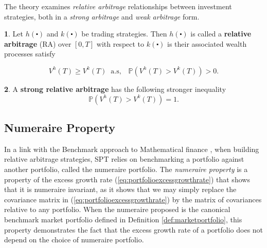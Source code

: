 \documentclass[british]{amsart} \usepackage{lmodern}
\numberwithin{equation}{section} \numberwithin{figure}{section}
\theoremstyle{plain} \newtheorem{thm}{\protect\theoremname}[section]
\theoremstyle{definition} \newtheorem{defn}[thm]{\protect\definitionname}
\theoremstyle{plain} \newtheorem{assumption}[thm]{\protect\assumptionname}
\theoremstyle{plain} \newtheorem{lem}[thm]{\protect\lemmaname}
\theoremstyle{plain} \newtheorem{prop}[thm]{\protect\propositionname}
\theoremstyle{remark} \newtheorem{rem}[thm]{\protect\remarkname}
\theoremstyle{plain} \newtheorem{cor}[thm]{\protect\corollaryname}
\begin{document}
The theory examines \textit{relative arbitrage} relationships between investment
strategies, both in a \textit{strong arbitrage} and \textit{weak arbitrage}
form.

\begin{defn}
  Let $h(\centerdot)$ and $k(\centerdot)$ be trading strategies. Then
  $h(\centerdot)$ is called a \textbf{relative arbitrage} (RA) over
  $[0,T]$ with respect to $k(\centerdot)$ is their associated wealth
  processes satisfy

  \begin{equation}
    V^{h}(T)\ge V^{k}(T)\;\;\text{a.s},\;\;\;\mathbb{P}(V^{h}(T)>V^{k}(T))>0.
  \end{equation}
\end{defn}

\begin{defn}
  A \textbf{strong relative arbitrage} has the following stronger inequality
  \begin{equation}
    \mathbb{P}(V^{h}(T)>V^{k}(T))=1.
  \end{equation}
\end{defn}

\subsection{Numeraire Property}

In a link with the Benchmark approach to Mathematical finance \cite{platen2006},
when building relative arbitrage strategies, SPT relies on benchmarking a
portfolio against another portfolio, called the numeraire portfolio. The
\textit{numeraire property} is a property of the excess growth rate
(\ref{eq:portfolioexcessgrowthrate}) that shows that it is numeraire invariant,
as it shows that we may simply replace the covariance matrix in
(\ref{eq:portfolioexcessgrowthrate}) by the matrix of covariances relative to
any portfolio. When the numeraire proposed is the canonical benchmark market
portfolio defined in Definition \ref{def:marketportfolio}, this property
demonstrates the fact that the excess growth rate of a portfolio does not depend
on the choice of numeraire portfolio.
\end{document}

